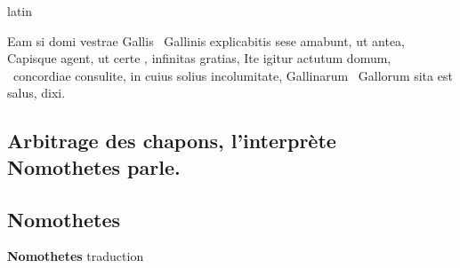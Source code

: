 \documentclass[12pt]{book}
\renewenvironment{latin}
    	{\begin{hyphenrules}{latin}}
    	{\end{hyphenrules}}
\begin{document}
\begin{pages}
\begin{latin}
\begin{Leftside}
                    Eam si domi vestrae Gallis ﻿\ampersand\ Gallinis explicabitis sese amabunt, ut antea, 
                    Capisque agent, ut certe , infinitas gratias, 
                    Ite igitur actutum domum, ﻿\ampersand\ concordiae consulite, 
                    in cuius solius incolumitate, Gallinarum ﻿\ampersand\ Gallorum sita est salus, dixi.
                \pend 
        \endnumbering
        \end{Leftside}
        \end{latin}

        \begin{Rightside}
        \beginnumbering
            \pstart\section*{Arbitrage des chapons, l'interprète Nomothetes parle.}\pend\pstart\subsection*{Nomothetes}\pend\pstart\textbf{Nomothetes}\hspace{1cm} 
                        traduction
                    \pend
        \endnumbering
        \end{Rightside}
        \end{pages}
        \Pages
        
\end{document}
